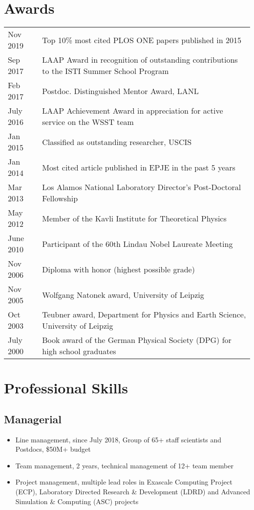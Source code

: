 \documentclass{article}
\begin{document}
\section*{Awards}
\begin{tabular}{ll}
Nov 2019 & Top 10\% most cited PLOS ONE papers published in 2015 \\
Sep 2017 & LAAP Award in recognition of outstanding contributions to the ISTI Summer School Program \\
Feb 2017 & Postdoc. Distinguished Mentor Award, LANL \\
July 2016 & LAAP Achievement Award in appreciation for active service on the WSST team \\
Jan 2015 & Classified as outstanding researcher, USCIS \\
Jan 2014 & Most cited article published in EPJE in the past 5 years \\
Mar 2013 & Los Alamos National Laboratory Director's Post-Doctoral Fellowship \\
May 2012 & Member of the Kavli Institute for Theoretical Physics\\
June 2010 & Participant of the 60th Lindau Nobel Laureate Meeting\\
Nov 2006 & Diploma with honor (highest possible grade) \\
Nov 2005  & Wolfgang Natonek award, University of Leipzig\\
Oct 2003  & Teubner award, Department for Physics and Earth Science, University of Leipzig\\
July 2000 & Book award of the German Physical Society (DPG) for high school graduates\\
\end{tabular}

\section*{Professional Skills}

\subsection*{Managerial}

\begin{itemize}
\setlength{\itemsep}{0pt}
\setlength{\parskip}{0pt}
\setlength{\parsep}{0pt}
\item Line management, since July 2018, Group of 65+ staff scientists and Postdocs, \$50M+ budget 
\item Team management, 2 years, technical management of 12+ team member
\item Project management, multiple lead roles in Exascale Computing Project (ECP), Laboratory Directed Research \& Development (LDRD) and Advanced Simulation \& Computing (ASC) projects 
\end{itemize}
\end{document}
